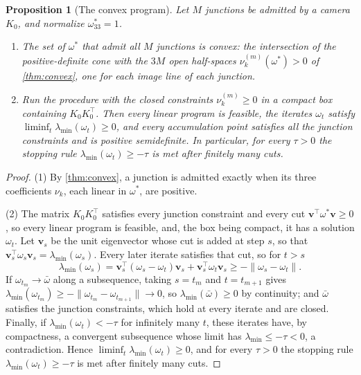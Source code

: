 \documentclass[pdflatex,sn-mathphys-num,iicol]{sn-jnl}
\theoremstyle{thmstyleone}
\newtheorem{proposition}[theorem]{Proposition}
\theoremstyle{thmstylethree}
\theoremstyle{thmstyletwo}
\begin{document}
\begin{proposition}[The convex program]\label{prop:program}
Let $M$ junctions be admitted by a camera $K_0$, and normalize $\omega^{*}_{33}=1$.
\begin{enumerate}
\item The set of $\omega^{*}$ that admit all $M$ junctions is convex: the intersection of the positive-definite cone with the $3M$ open half-spaces $\nu^{(m)}_k(\omega^{*})>0$ of \cref{thm:convex}, one for each image line of each junction.
\item Run the procedure with the closed constraints $\nu^{(m)}_k\ge0$ in a compact box containing $K_0K_0^{\top}$. Then every linear program is feasible, the iterates $\omega_t$ satisfy $\liminf_t\lambda_{\min}(\omega_t)\ge0$, and every accumulation point satisfies all the junction constraints and is positive semidefinite. In particular, for every $\tau>0$ the stopping rule $\lambda_{\min}(\omega_t)\ge-\tau$ is met after finitely many cuts.
\end{enumerate}
\end{proposition}
\begin{proof}
(1) By \cref{thm:convex}, a junction is admitted exactly when its three coefficients $\nu_k$, each linear in $\omega^{*}$, are positive.

(2) The matrix $K_0K_0^{\top}$ satisfies every junction constraint and every cut $\mathbf v^{\top}\omega^{*}\mathbf v\ge0$, so every linear program is feasible, and, the box being compact, it has a solution $\omega_t$. Let $\mathbf v_s$ be the unit eigenvector whose cut is added at step $s$, so that $\mathbf v_s^{\top}\omega_s\mathbf v_s=\lambda_{\min}(\omega_s)$. Every later iterate satisfies that cut, so for $t>s$
\[
\lambda_{\min}(\omega_s)=\mathbf v_s^{\top}(\omega_s-\omega_t)\mathbf v_s+\mathbf v_s^{\top}\omega_t\mathbf v_s\ge-\|\omega_s-\omega_t\| .
\]
If $\omega_{t_m}\to\bar\omega$ along a subsequence, taking $s=t_m$ and $t=t_{m+1}$ gives $\lambda_{\min}(\omega_{t_m})\ge-\|\omega_{t_m}-\omega_{t_{m+1}}\|\to0$, so $\lambda_{\min}(\bar\omega)\ge0$ by continuity; and $\bar\omega$ satisfies the junction constraints, which hold at every iterate and are closed. Finally, if $\lambda_{\min}(\omega_t)<-\tau$ for infinitely many $t$, these iterates have, by compactness, a convergent subsequence whose limit has $\lambda_{\min}\le-\tau<0$, a contradiction. Hence $\liminf_t\lambda_{\min}(\omega_t)\ge0$, and for every $\tau>0$ the stopping rule $\lambda_{\min}(\omega_t)\ge-\tau$ is met after finitely many cuts.
\end{proof}
\end{document}
